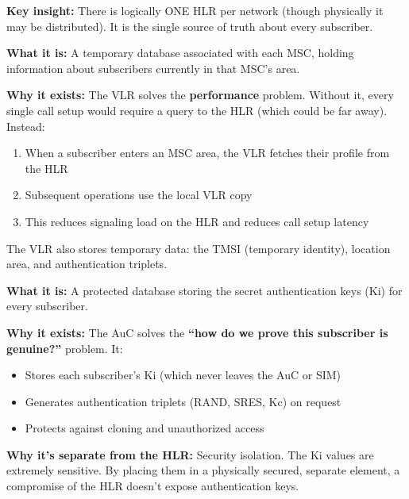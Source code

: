 \begin{CNinsight}

\textbf{Key insight:} There is logically ONE HLR per network (though physically it may be distributed). It is the single source of truth about every subscriber.

\end{CNinsight}


\textbf{What it is:} A temporary database associated with each MSC, holding information about subscribers currently in that MSC’s area.

\textbf{Why it exists:} The VLR solves the \textbf{performance} problem. Without it, every single call setup would require a query to the HLR (which could be far away). Instead:

\begin{enumerate}
\def\labelenumi{\arabic{enumi}.}
\tightlist
\item
  When a subscriber enters an MSC area, the VLR fetches their profile from the HLR
\item
  Subsequent operations use the local VLR copy
\item
  This reduces signaling load on the HLR and reduces call setup latency
\end{enumerate}

The VLR also stores temporary data: the TMSI (temporary identity), location area, and authentication triplets.


\textbf{What it is:} A protected database storing the secret authentication keys (Ki) for every subscriber.

\textbf{Why it exists:} The AuC solves the \textbf{``how do we prove this subscriber is genuine?''} problem. It:

\begin{itemize}
\tightlist
\item
  Stores each subscriber’s Ki (which never leaves the AuC or SIM)
\item
  Generates authentication triplets (RAND, SRES, Kc) on request
\item
  Protects against cloning and unauthorized access
\end{itemize}

\textbf{Why it’s separate from the HLR:} Security isolation. The Ki values are extremely sensitive. By placing them in a physically secured, separate element, a compromise of the HLR doesn’t expose authentication keys.

